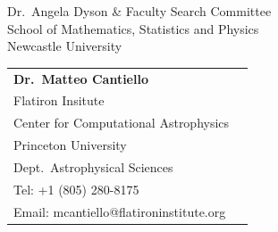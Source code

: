 \documentclass[12pt]{letter}
\begin{document}
\begin{letter}{
        Dr.~Angela Dyson \& Faculty Search Committee \\
        School of Mathematics, Statistics and Physics \\
        Newcastle University}
\begin{tabular}{ll}
        \textbf{Dr.~Matteo Cantiello}                          & \\
         Flatiron Insitute                                     & \\
         \hspace{0.2in}Center for Computational Astrophysics   & \\
         Princeton University                                  & \\
         \hspace{0.2in}Dept.~Astrophysical Sciences & \\
         Tel: +1 (805) 280-8175  & \\
         Email: mcantiello@flatironinstitute.org & \\
    \end{tabular}

    \normalsize


\end{letter}
\end{document}
